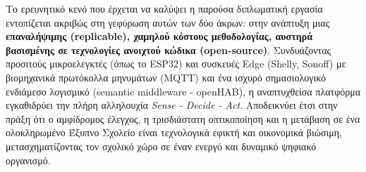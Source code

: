 Το ερευνητικό κενό που έρχεται να καλύψει η παρούσα διπλωματική εργασία εντοπίζεται ακριβώς στη γεφύρωση αυτών των δύο άκρων: στην ανάπτυξη μιας \textbf{επαναλήψιμης (replicable), χαμηλού κόστους μεθοδολογίας, αυστηρά βασισμένης σε τεχνολογίες ανοιχτού κώδικα (open-source)}. Συνδυάζοντας προσιτούς μικροελεγκτές (όπως το ESP32) και συσκευές Edge (Shelly, Sonoff) με βιομηχανικά πρωτόκολλα μηνυμάτων (MQTT) και ένα ισχυρό σημασιολογικό ενδιάμεσο λογισμικό (semantic middleware - openHAB), η αναπτυχθείσα πλατφόρμα εγκαθιδρύει την πλήρη αλληλουχία \textit{Sense - Decide - Act}. Αποδεικνύει έτσι στην πράξη ότι ο αμφίδρομος έλεγχος, η τρισδιάστατη οπτικοποίηση και η μετάβαση σε ένα ολοκληρωμένο Έξυπνο Σχολείο είναι τεχνολογικά εφικτή και οικονομικά βιώσιμη, μετασχηματίζοντας τον σχολικό χώρο σε έναν ενεργό και δυναμικό ψηφιακό οργανισμό.
